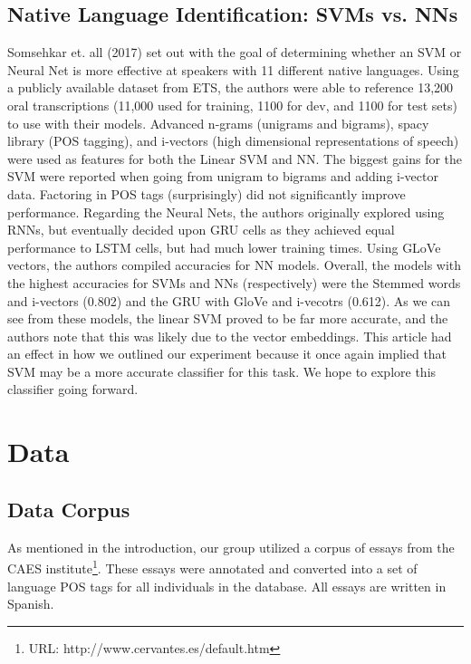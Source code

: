 \documentclass[11pt,a4paper]{article}
\newcommand\tab[1][1cm]{\hspace*{#1}}
\begin{document}
 \subsection{Native Language Identification: SVMs vs. NNs}
 \tab Somsehkar et. all (2017) set out with the goal of determining whether an SVM or Neural Net is more effective at speakers with 11 different native languages. Using a publicly available dataset from ETS, the authors were able to reference 13,200 oral transcriptions (11,000 used for training, 1100 for dev, and 1100 for test sets) to use with their models. Advanced n-grams (unigrams and bigrams), spacy library (POS tagging), and i-vectors (high dimensional representations of speech) were used as features for both the Linear SVM and NN. The biggest gains for the SVM were reported when going from unigram to bigrams and adding i-vector data. Factoring in POS tags (surprisingly) did not significantly improve performance. Regarding the Neural Nets, the authors originally explored using RNNs, but eventually decided upon GRU cells as they achieved equal performance to LSTM cells, but had much lower training times. Using GLoVe vectors, the authors compiled accuracies for NN models. Overall, the models with the highest accuracies for SVMs and NNs (respectively) were the Stemmed words and i-vectors (0.802) and the GRU with GloVe and i-vecotrs (0.612). As we can see from these models, the linear SVM proved to be far more accurate, and the authors note that this was likely due to the vector embeddings. This article had an effect in how we outlined our experiment because it once again implied that SVM may be a more accurate classifier for this task. We hope to explore this classifier going forward.


\section{Data}
\subsection{Data Corpus}
\tab As mentioned in the introduction, our group utilized a corpus of essays from the CAES institute\footnote{URL: http://www.cervantes.es/default.htm}. These essays were annotated and converted into a set of language POS tags for all individuals in the database. All essays are written in Spanish. 
\end{document}
